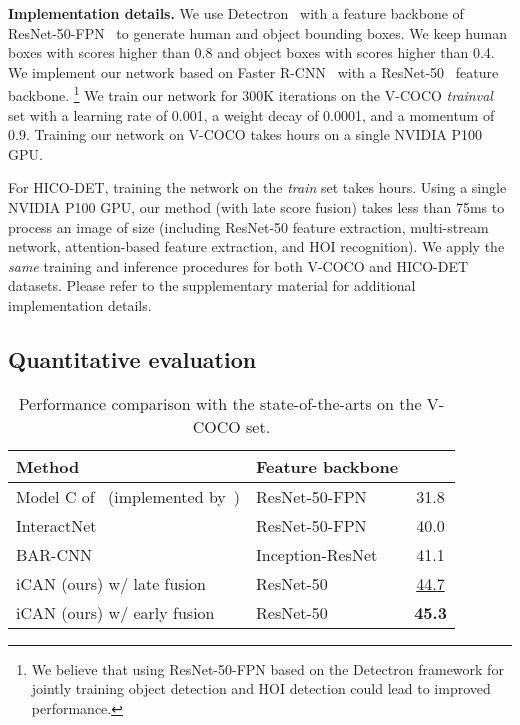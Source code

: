 \documentclass{bmvc2k}
\newlength\secmargin
\newlength\tabmargin
\newcommand {\para}[1]{\vspace{1.5mm} \noindent \textbf{#1}}
\newcommand {\jiabin}[1]{{\color{blue}\textbf{Jia-Bin: }#1}\normalfont}
\renewcommand{\jiabin}[1]{}
\begin{document}
\para{Implementation details.} 
We use Detectron~\cite{Detectron} with a feature backbone of ResNet-50-FPN~\cite{Lin-CVPR-Pyramid} to generate human and object bounding boxes.
We keep human boxes with scores  higher than 0.8 and object boxes with scores  higher than 0.4.
We implement our network based on Faster R-CNN~\cite{Ren-NIPS-FasterRCNN} with a ResNet-50~\cite{He-CVPR-ResNet} feature backbone.
\footnote{We believe that using ResNet-50-FPN based on the Detectron framework for jointly training object detection and HOI detection could lead to improved performance.}
We train our network for 300K iterations on the V-COCO \emph{trainval} set with a learning rate of 0.001, a weight decay of 0.0001, and a momentum of 0.9. 
Training our network on V-COCO takes  hours on a single NVIDIA P100 GPU. 
\jiabin{Please verify the details.}
For HICO-DET, training the network on the \emph{train} set takes  hours.
Using a single NVIDIA P100 GPU, our method (with late score fusion) takes less than 75ms to process an image of size  (including ResNet-50 feature extraction, multi-stream network, attention-based feature extraction, and HOI recognition).
We apply the \emph{same} training and inference procedures for both V-COCO and HICO-DET datasets.
Please refer to the supplementary material for additional implementation details.




\vspace{\secmargin}
\subsection{Quantitative evaluation
}
\vspace{\secmargin}

 \begin{table}[t]
\centering
\caption{Performance comparison with the state-of-the-arts on the V-COCO  set.}
\label{tab:vcoco_comparison}

\vspace{2mm}
\begin{tabular}{ll|c}
\toprule
Method & Feature backbone &  \\
\midrule
Model C of~\cite{Gupta-SemanticRoleLabeling} (implemented by~\cite{Gkioxari-CVPR-InteractNet}) & ResNet-50-FPN & 31.8\\
InteractNet~\cite{Gkioxari-CVPR-InteractNet}      & ResNet-50-FPN & 40.0 \\
BAR-CNN~\cite{kolesnikov2018detecting} & Inception-ResNet~\cite{szegedy2016rethinking}&  41.1 \\
iCAN (ours) w/ late fusion               & ResNet-50  & \underline{44.7} \\
iCAN (ours) w/ early fusion              & ResNet-50  & {\textbf{45.3}} \\
\bottomrule
\end{tabular}
\vspace{\tabmargin}
\end{table}
\end{document}
